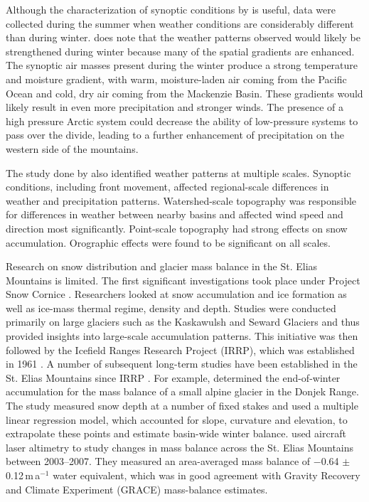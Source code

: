 \documentclass{sfuthesis}
\begin{document}
\begin{appendices}
Although the characterization of synoptic conditions by \cite{Taylor1969} is useful, data were collected during the summer when weather conditions are considerably different than during winter. \cite{Taylor1969} does note that the weather patterns observed would likely be strengthened during winter because many of the spatial gradients are enhanced. The synoptic air masses present during the winter produce a strong temperature and moisture gradient, with warm, moisture-laden air coming from the Pacific Ocean and cold, dry air coming from the Mackenzie Basin. These gradients would likely result in even more precipitation and stronger winds. The presence of a high pressure Arctic system could decrease the ability of low-pressure systems to pass over the divide, leading to a further enhancement of precipitation on the western side of the mountains. 

The study done by \cite{Taylor1969} also identified weather patterns at multiple scales. Synoptic conditions, including front movement, affected regional-scale differences in weather and precipitation patterns. Watershed-scale topography was responsible for differences in weather between nearby basins and affected wind speed and direction most significantly. Point-scale topography had strong effects on snow accumulation. Orographic effects were found to be significant on all scales. 

Research on snow distribution and glacier mass balance in the St. Elias Mountains is limited. The first significant investigations took place under Project Snow Cornice \citep{Wood1948}. Researchers looked at snow accumulation and ice formation as well as ice-mass thermal regime, density and depth. Studies were conducted primarily on large glaciers such as the Kaskawulsh and Seward Glaciers and thus provided insights into large-scale accumulation patterns. This initiative was then followed by the Icefield Ranges Research Project (IRRP), which was established in 1961 \citep{Danby2003}. A number of subsequent long-term studies have been established in the St. Elias Mountains since IRRP \citep[e.g.][]{Clarke1984, Paoli2009}. For example, \cite{Wheler2014} determined the end-of-winter accumulation for the mass balance of a small alpine glacier in the Donjek Range. The study measured snow depth at a number of fixed stakes and used a multiple linear regression model, which accounted for slope, curvature and elevation, to extrapolate these points and estimate basin-wide winter balance. \cite{Arendt2008} used aircraft laser altimetry to study changes in mass balance across the St. Elias Mountains between 2003--2007. They measured an area-averaged mass balance of $-$0.64 $\pm$ 0.12\,m\,a$^{-1}$ water equivalent, which was in good agreement with Gravity Recovery and Climate Experiment (GRACE) mass-balance estimates.


\end{appendices}
\end{document}
